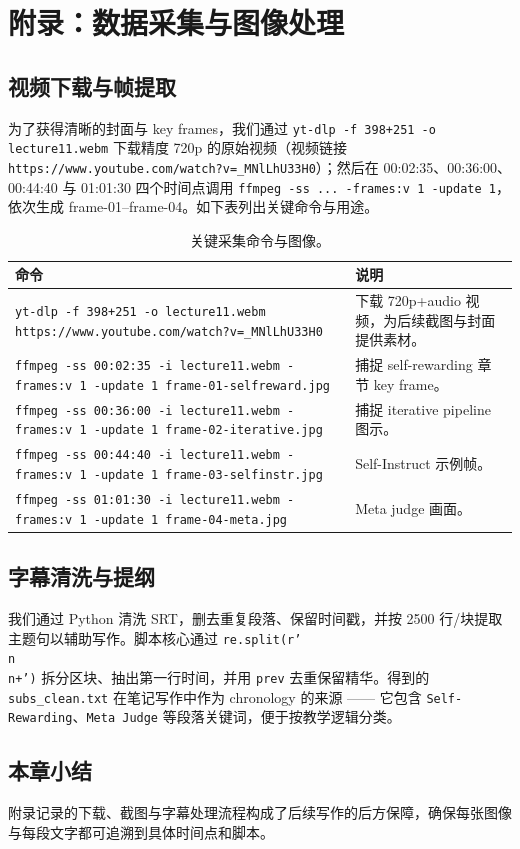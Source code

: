\section{附录：数据采集与图像处理}
\subsection{视频下载与帧提取}
为了获得清晰的封面与 key frames，我们通过 \texttt{yt-dlp -f 398+251 -o lecture11.webm} 下载精度 720p 的原始视频（视频链接 \texttt{https://www.youtube.com/watch?v=\_MNlLhU33H0}）；然后在 00:02:35、00:36:00、00:44:40 与 01:01:30 四个时间点调用 \texttt{ffmpeg -ss ... -frames:v 1 -update 1}，依次生成 frame-01–frame-04。如下表列出关键命令与用途。

\begin{table}[H]
\centering
\begin{tabular}{p{6cm}p{9cm}}
\toprule
命令 & 说明 \\
\midrule
\texttt{yt-dlp -f 398+251 -o lecture11.webm https://www.youtube.com/watch?v=\_MNlLhU33H0} & 下载 720p+audio 视频，为后续截图与封面提供素材。 \\
\texttt{ffmpeg -ss 00:02:35 -i lecture11.webm -frames:v 1 -update 1 frame-01-selfreward.jpg} & 捕捉 self-rewarding 章节 key frame。 \\
\texttt{ffmpeg -ss 00:36:00 -i lecture11.webm -frames:v 1 -update 1 frame-02-iterative.jpg} & 捕捉 iterative pipeline 图示。 \\
\texttt{ffmpeg -ss 00:44:40 -i lecture11.webm -frames:v 1 -update 1 frame-03-selfinstr.jpg} & Self-Instruct 示例帧。 \\
\texttt{ffmpeg -ss 01:01:30 -i lecture11.webm -frames:v 1 -update 1 frame-04-meta.jpg} & Meta judge 画面。 \\
\bottomrule
\end{tabular}
\caption{关键采集命令与图像。}
\end{table}

\subsection{字幕清洗与提纲}
我们通过 Python 清洗 SRT，删去重复段落、保留时间戳，并按 2500 行/块提取主题句以辅助写作。脚本核心通过 \texttt{re.split(r'\\n\\n+')} 拆分区块、抽出第一行时间，并用 \texttt{prev} 去重保留精华。得到的 \texttt{subs\_clean.txt} 在笔记写作中作为 chronology 的来源 —— 它包含 \texttt{Self-Rewarding}、\texttt{Meta Judge} 等段落关键词，便于按教学逻辑分类。

\subsection{本章小结}
附录记录的下载、截图与字幕处理流程构成了后续写作的后方保障，确保每张图像与每段文字都可追溯到具体时间点和脚本。

